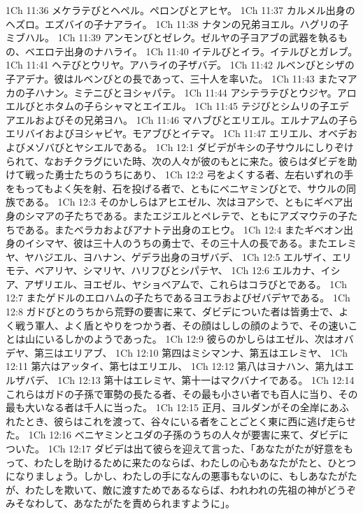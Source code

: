 1Ch 11:36  メケラテびとヘペル。ペロンびとアヒヤ。
1Ch 11:37  カルメル出身のヘズロ。エズバイの子ナアライ。
1Ch 11:38  ナタンの兄弟ヨエル。ハグリの子ミブハル。
1Ch 11:39  アンモンびとゼレク。ゼルヤの子ヨアブの武器を執るもの、ベエロテ出身のナハライ。
1Ch 11:40  イテルびとイラ。イテルびとガレブ。
1Ch 11:41  ヘテびとウリヤ。アハライの子ザバデ。
1Ch 11:42  ルベンびとシザの子アデナ。彼はルベンびとの長であって、三十人を率いた。
1Ch 11:43  またマアカの子ハナン。ミテニびとヨシャパテ。
1Ch 11:44  アシテラテびとウジヤ。アロエルびとホタムの子らシャマとエイエル。
1Ch 11:45  テジびとシムリの子エデアエルおよびその兄弟ヨハ。
1Ch 11:46  マハブびとエリエル。エルナアムの子らエリバイおよびヨシャビヤ。モアブびとイテマ。
1Ch 11:47  エリエル、オベデおよびメゾバびとヤシエルである。
1Ch 12:1  ダビデがキシの子サウルにしりぞけられて、なおチクラグにいた時、次の人々が彼のもとに来た。彼らはダビデを助けて戦った勇士たちのうちにあり、
1Ch 12:2  弓をよくする者、左右いずれの手をもってもよく矢を射、石を投げる者で、ともにベニヤミンびとで、サウルの同族である。
1Ch 12:3  そのかしらはアヒエゼル、次はヨアシで、ともにギベア出身のシマアの子たちである。またエジエルとペレテで、ともにアズマウテの子たちである。またベラカおよびアナトテ出身のエヒウ。
1Ch 12:4  またギベオン出身のイシマヤ、彼は三十人のうちの勇士で、その三十人の長である。またエレミヤ、ヤハジエル、ヨハナン、ゲデラ出身のヨザバデ、
1Ch 12:5  エルザイ、エリモテ、ベアリヤ、シマリヤ、ハリフびとシパテヤ、
1Ch 12:6  エルカナ、イシア、アザリエル、ヨエゼル、ヤショベアムで、これらはコラびとである。
1Ch 12:7  またゲドルのエロハムの子たちであるヨエラおよびゼバデヤである。
1Ch 12:8  ガドびとのうちから荒野の要害に来て、ダビデについた者は皆勇士で、よく戦う軍人、よく盾とやりをつかう者、その顔はししの顔のようで、その速いことは山にいるしかのようであった。
1Ch 12:9  彼らのかしらはエゼル、次はオバデヤ、第三はエリアブ、
1Ch 12:10  第四はミシマンナ、第五はエレミヤ、
1Ch 12:11  第六はアッタイ、第七はエリエル、
1Ch 12:12  第八はヨナハン、第九はエルザバデ、
1Ch 12:13  第十はエレミヤ、第十一はマクバナイである。
1Ch 12:14  これらはガドの子孫で軍勢の長たる者、その最も小さい者でも百人に当り、その最も大いなる者は千人に当った。
1Ch 12:15  正月、ヨルダンがその全岸にあふれたとき、彼らはこれを渡って、谷々にいる者をことごとく東に西に逃げ走らせた。
1Ch 12:16  ベニヤミンとユダの子孫のうちの人々が要害に来て、ダビデについた。
1Ch 12:17  ダビデは出て彼らを迎えて言った、「あなたがたが好意をもって、わたしを助けるために来たのならば、わたしの心もあなたがたと、ひとつになりましょう。しかし、わたしの手になんの悪事もないのに、もしあなたがたが、わたしを欺いて、敵に渡すためであるならば、われわれの先祖の神がどうぞみそなわして、あなたがたを責められますように」。
